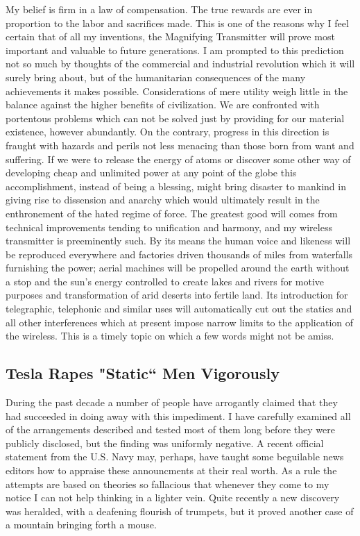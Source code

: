 \documentclass[a4paper,12pt,english,twoside,openright]{memoir}
\begin{document}
My belief is firm in a law of compensation.  The true rewards are ever in proportion to the labor 
and sacrifices made.  This is one of the reasons why I feel certain that of all my inventions, the 
Magnifying Transmitter will prove most important and valuable to future generations.  I am 
prompted to this prediction not so much by thoughts of the commercial and industrial revolution 
which it will surely bring about, but of the humanitarian consequences of the many achievements 
it makes possible.  Considerations of mere utility weigh little in the balance against the higher 
benefits of civilization.  We are confronted with portentous problems which can not be solved just 
by providing for our material existence, however abundantly.  On the contrary, progress in this 
direction is fraught with hazards and perils not less menacing than those born from want and 
suffering.  If we were to release the energy of atoms or discover some other way of developing 
cheap and unlimited power at any point of the globe this accomplishment, instead of being a 
blessing, might bring disaster to mankind in giving rise to dissension and anarchy which would 
ultimately result in the enthronement of the hated regime of force.  The greatest good will comes 
from technical improvements tending to unification and harmony, and my wireless transmitter is 
preeminently such.  By its means the human voice and likeness will be reproduced everywhere 
and factories driven thousands of miles from waterfalls furnishing the power; aerial machines will 
be propelled around the earth without a stop and the sun's energy controlled to create lakes and 
rivers for motive purposes and transformation of arid deserts into fertile land.  Its introduction for 
telegraphic, telephonic and similar uses will automatically cut out the statics and all other 
interferences which at present impose narrow limits to the application of the wireless. This is a timely topic on which a few words might not be amiss.   



\subsection{Tesla Rapes "Static`` Men Vigorously}
During the past decade a number 
of people have arrogantly claimed that they had succeeded in doing away with this impediment.  I 
have carefully examined all of the arrangements described and tested most of them long before 
they were publicly disclosed, but the finding was uniformly negative.  A recent official statement 
from the U.S. Navy may, perhaps, have taught some beguilable news editors how to appraise 
these announcments at their real worth.  As a rule the attempts are based on theories so 
fallacious that whenever they come to my notice I can not help thinking in a lighter vein.  Quite 
recently a new discovery was heralded, with a deafening flourish of trumpets, but it proved 
another case of a mountain bringing forth a mouse.  
\end{document}
